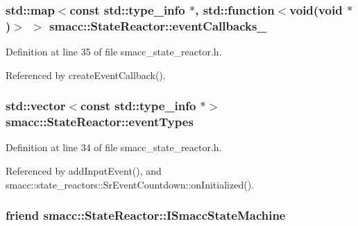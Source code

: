 \subsubsection[{\texorpdfstring{event\+Callbacks\+\_\+}{eventCallbacks_}}]{\setlength{\rightskip}{0pt plus 5cm}std\+::map$<$const std\+::type\+\_\+info $\ast$, std\+::function$<$void(void $\ast$)$>$ $>$ smacc\+::\+State\+Reactor\+::event\+Callbacks\+\_\+}\hypertarget{classsmacc_1_1StateReactor_a63cce05c412f3699cc1b15af9aeaf8af}{}\label{classsmacc_1_1StateReactor_a63cce05c412f3699cc1b15af9aeaf8af}


Definition at line 35 of file smacc\+\_\+state\+\_\+reactor.\+h.



Referenced by create\+Event\+Callback().

\subsubsection[{\texorpdfstring{event\+Types}{eventTypes}}]{\setlength{\rightskip}{0pt plus 5cm}std\+::vector$<$const std\+::type\+\_\+info $\ast$$>$ smacc\+::\+State\+Reactor\+::event\+Types}\hypertarget{classsmacc_1_1StateReactor_a65c8ddfce40e7859e5c73fff1cf6c04b}{}\label{classsmacc_1_1StateReactor_a65c8ddfce40e7859e5c73fff1cf6c04b}


Definition at line 34 of file smacc\+\_\+state\+\_\+reactor.\+h.



Referenced by add\+Input\+Event(), and smacc\+::state\+\_\+reactors\+::\+Sr\+Event\+Countdown\+::on\+Initialized().

\subsubsection[{\texorpdfstring{I\+Smacc\+State\+Machine}{ISmaccStateMachine}}]{\setlength{\rightskip}{0pt plus 5cm}friend smacc\+::\+State\+Reactor\+::\+I\+Smacc\+State\+Machine\hspace{0.3cm}{\ttfamily [private]}}\hypertarget{classsmacc_1_1StateReactor_ad488bca73fa841277318d8b94c3a9421}{}\label{classsmacc_1_1StateReactor_ad488bca73fa841277318d8b94c3a9421}


